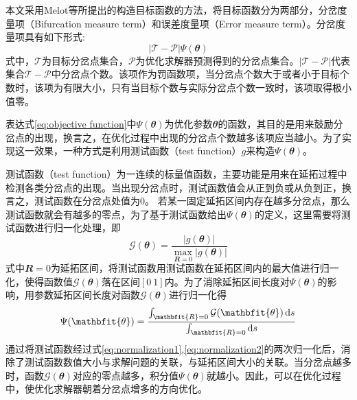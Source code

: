 本文采用Melot等\cite{melot:hal-04378993}所提出的构造目标函数的方法，将目标函数分为两部分，分岔度量项（Bifurcation measure term）和误差度量项（Error measure term）。分岔度量项具有如下形式:
\begin{equation}
	\left|\mathcal{T}-\mathcal{P}\right|\Psi\left(\mathbfit{\theta} \right)
	\label{eq:objective function}
\end{equation}
式中，$\mathcal{T}$为目标分岔点集合，$\mathcal{P}$为优化求解器预测得到的分岔点集合。$\left|\mathcal{T}-\mathcal{P}\right|$代表集合$\mathcal{T}-\mathcal{P}$中分岔点个数。该项作为罚函数项，当分岔点个数大于或者小于目标个数时，该项为有限大小，只有当目标个数与实际分岔点个数一致时，该项取得极小值零。

表达式\eqref{eq:objective function}中$\Psi\left(\mathbfit{\theta} \right)$为优化参数$\mathbfit{\theta}$的函数，其目的是用来鼓励分岔点的出现，换言之，在优化过程中出现的分岔点个数越多该项应当越小。为了实现这一效果，一种方式是利用测试函数（test function）$g$来构造$\Psi\left(\mathbfit{\theta} \right)$。

测试函数（test function）\cite{seydel2009practical}为一连续的标量值函数，主要功能是用来在延拓过程中检测各类分岔点的出现。当出现分岔点时，测试函数值会从正到负或从负到正，换言之，测试函数在分岔点处值为0。 若某一固定延拓区间内存在越多分岔点，那么测试函数就会有越多的零点，为了基于测试函数给出$\Psi\left(\mathbfit{\theta} \right)$的定义，这里需要将测试函数进行归一化处理，即
\begin{equation}
	\mathcal{G}(\mathbfit{\theta})=\frac{|g(\mathbfit{\theta})|}{\underset{\mathbfit{R}=\mathbfit{0}}{\max}|g(\mathbfit{\theta})|}
	\label{eq:normalization1}
\end{equation}
式中$\mathbfit{R}=0$为延拓区间，将测试函数用测试函数在延拓区间内的最大值进行归一化，使得函数值$\mathcal{G}(\mathbfit{\theta})$落在区间$\left[0~1\right]$内。为了消除延拓区间长度对$\Psi\left(\mathbfit{\theta}\right)$的影响，用参数延拓区间长度对函数$\mathcal{G}(\mathbfit{\theta})$进行归一化得
\begin{equation}
	\Psi(\mathbfit{\theta})=\frac{\int_{\mathbfit{R}=0} \mathcal{G}(\mathbfit{\theta}) \dif s}{\int_{\mathbfit{R}=0} \dif  s}
	\label{eq:normalization2}
\end{equation}
通过将测试函数经过式\eqref {eq:normalization1},\eqref{eq:normalization2}的两次归一化后，消除了测试函数数值大小与求解问题的关联，与延拓区间大小的关联。当分岔点越多时，函数$\mathcal{G}(\mathbfit{\theta})$对应的零点越多，积分值$\Psi\left(\mathbfit{\theta} \right)$就越小。因此，可以在优化过程中，使优化求解器朝着分岔点增多的方向优化。
	
